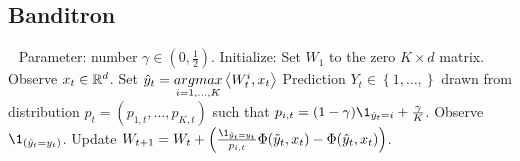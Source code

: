 \subsection*{Banditron}
\begin{algo}[Banditron]
\label{algo:banditron}
\begin{algorithmic}
\STATE $\ \ $ 
\STATE Parameter: number $\gamma\in \left(0,\frac{1}{2}\right)$.
\STATE Initialize: Set $W_1$ to the zero $K \times d$ matrix.
	\STATE Observe $x_t \in \mathbb{R}^d$.
    \STATE Set $\hat{y}_t = \underset{i = 1,\dots,K}{argmax}\left\langle W_t^i ,x_t\right\rangle$
	\STATE Prediction $Y_t \in \left\lbrace1,\dots,\right\rbrace$ drawn from distribution $p_t = \left(p_{1,t},\dots ,p_{K,t}\right)$ such that $p_{i,t} = (1-\gamma)\1_{\hat{y}_t=i} +\frac{\gamma}{K}$.
    \STATE Observe $\1_{(\hat{y}_t=y_t)}$.
    \STATE Update $W_{t+1} = W_t + \left(\frac{\1_{\tilde{y}_t=y_t}}{p_{i,t}}\Phi(\tilde{y}_t,x_t)-\Phi(\hat{y}_t,x_t)\right)$.
\ENDFOR
\end{algorithmic}
\end{algo}

